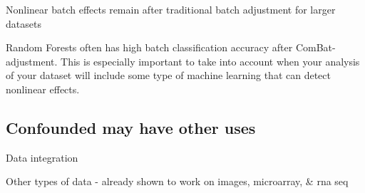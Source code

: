 \documentclass[notitlepage]{article}
\begin{document}
Nonlinear batch effects remain after traditional batch adjustment for larger datasets

Random Forests often has high batch classification accuracy after ComBat-adjustment.
This is especially important to take into account when your analysis of your dataset will include some type of machine learning that can detect nonlinear effects.

\subsection{Confounded may have other uses}

Data integration

Other types of data - already shown to work on images, microarray, \& rna seq


\end{document}
